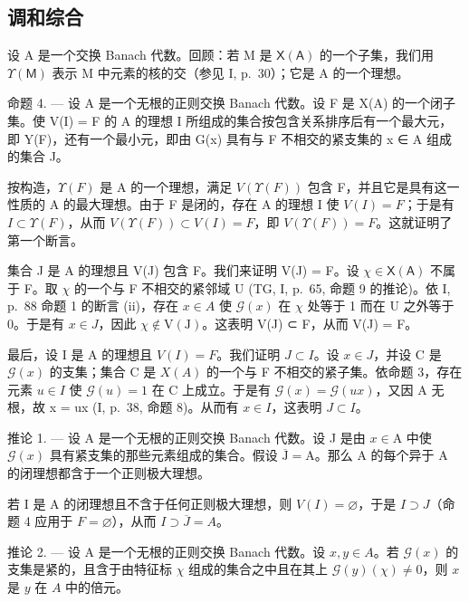 \subsection{调和综合}

设 A 是一个交换 Banach 代数。回顾：若 M 是 \(\mathsf{X}(\mathsf{A})\) 的一个子集，我们用 \(\Upsilon(\mathsf{M})\) 表示 M 中元素的核的交（参见 I, p.~30）；它是 A 的一个理想。

命题 4. --- 设 A 是一个无根的正则交换 Banach 代数。设 F 是 X(A) 的一个闭子集。使 V(I) = F 的 A 的理想 I 所组成的集合按包含关系排序后有一个最大元，即 Y(F)，还有一个最小元，即由 G(x) 具有与 F 不相交的紧支集的 x ∈ A 组成的集合 J。

按构造，\(\Upsilon(F)\) 是 A 的一个理想，满足 \(V(\Upsilon(F))\) 包含 F，并且它是具有这一性质的 A 的最大理想。由于 F 是闭的，存在 A 的理想 I 使 \(V(I) = F\)；于是有 \(I \subset \Upsilon(F)\)，从而 \(V(\Upsilon(F)) \subset V(I) = F\)，即 \(V(\Upsilon(F)) = F\)。这就证明了第一个断言。

集合 J 是 A 的理想且 V(J) 包含 F。我们来证明 V(J) = F。设 \(\chi \in \mathsf{X}(\mathsf{A})\) 不属于 F。取 \(\chi\) 的一个与 F 不相交的紧邻域 U (TG, I, p.~65, 命题 9 的推论)。依 I, p.~88 命题 1 的断言 (ii)，存在 \(x \in A\) 使 \(\mathcal{G}(x)\) 在 \(\chi\) 处等于 1 而在 U 之外等于 0。于是有 \(x \in J\)，因此 \(\chi \notin \mathrm{V}(\mathrm{J})\)。这表明 V(J) ⊂ F，从而 V(J) = F。

最后，设 I 是 A 的理想且 \(V(I) = F\)。我们证明 \(J \subset I\)。设 \(x \in J\)，并设 C 是 \(\mathcal{G}(x)\) 的支集；集合 C 是 \(X(A)\) 的一个与 F 不相交的紧子集。依命题 3，存在元素 \(u \in I\) 使 \(\mathcal{G}(u) = 1\) 在 C 上成立。于是有 \(\mathcal{G}(x) = \mathcal{G}(ux)\)，又因 A 无根，故 x = ux (I, p.~38, 命题 8)。从而有 \(x \in I\)，这表明 \(J \subset I\)。

推论 1. --- 设 A 是一个无根的正则交换 Banach 代数。设 J 是由 \(x \in \mathrm{A}\) 中使 \(\mathcal{G}(x)\) 具有紧支集的那些元素组成的集合。假设 \(\overline{\mathrm{J}} = \mathrm{A}\)。那么 A 的每个异于 A 的闭理想都含于一个正则极大理想。

若 I 是 A 的闭理想且不含于任何正则极大理想，则 \(V(I) = \varnothing\)，于是 \(I \supset J\)（命题 4 应用于 \(F = \varnothing\)），从而 \(I \supset \overline{J} = A\)。

推论 2. --- 设 A 是一个无根的正则交换 Banach 代数。设 \(x, y \in A\)。若 \(\mathcal{G}(x)\) 的支集是紧的，且含于由特征标 \(\chi\) 组成的集合之中且在其上 \(\mathcal{G}(y)(\chi) \neq 0\)，则 \(x\) 是 \(y\) 在 \(A\) 中的倍元。

